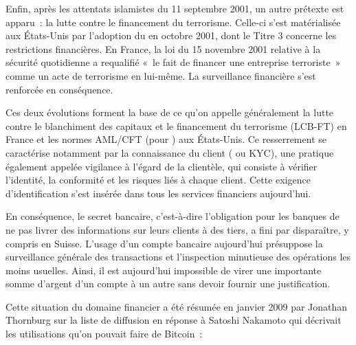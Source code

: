 Enfin, après les attentats islamistes du 11 septembre 2001, un autre prétexte est apparu~: la lutte contre le financement du terrorisme. Celle-ci s'est matérialisée aux États-Unis par l'adoption du  en octobre 2001, dont le Titre 3 concerne les restrictions financières. En France, la loi du 15 novembre 2001 relative à la sécurité quotidienne a requalifié «~le fait de financer une entreprise terroriste~» comme un acte de terrorisme en lui-même. La surveillance financière s'est renforcée en conséquence. %

Ces deux évolutions forment la base de ce qu'on appelle généralement la lutte contre le blanchiment des capitaux et le financement du terrorisme (LCB-FT) en France et les normes AML/CFT (pour ) aux États-Unis. Ce resserrement se caractérise notamment par la connaissance du client ( ou KYC), une pratique également appelée vigilance à l'égard de la clientèle, qui consiste à vérifier l'identité, la conformité et les risques liés à chaque client. Cette exigence d'identification s'est insérée dans tous les services financiers aujourd'hui.

En conséquence, le secret bancaire, c'est-à-dire l'obligation pour les banques de ne pas livrer des informations sur leurs clients à des tiers, a fini par disparaître, y compris en Suisse. L'usage d'un compte bancaire aujourd'hui présuppose la surveillance générale des transactions et l'inspection minutieuse des opérations les moins usuelles. Ainsi, il est aujourd'hui impossible de virer une importante somme d'argent d'un compte à un autre sans devoir fournir une justification.

Cette situation du domaine financier a été résumée en janvier 2009 par Jonathan Thornburg sur la liste de diffusion en réponse à Satoshi Nakamoto qui décrivait les utilisations qu'on pouvait faire de Bitcoin~:

